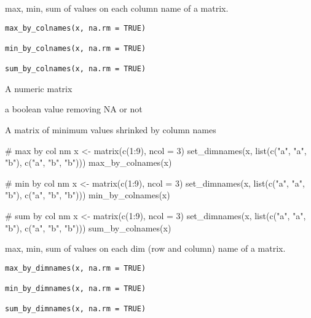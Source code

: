 \documentclass[letterpaper]{book}
\begin{document}
%
\begin{Description}
max, min, sum of values on each column name of a matrix.
\end{Description}
%
\begin{Usage}
\begin{verbatim}
max_by_colnames(x, na.rm = TRUE)

min_by_colnames(x, na.rm = TRUE)

sum_by_colnames(x, na.rm = TRUE)
\end{verbatim}
\end{Usage}
%
\begin{Arguments}
\begin{ldescription}
\item[\code{x}] A numeric matrix

\item[\code{na.rm}] a boolean value removing NA or not
\end{ldescription}
\end{Arguments}
%
\begin{Value}
A matrix of minimum values shrinked by column names
\end{Value}
%
\begin{Examples}
\begin{ExampleCode}
# max by col nm
x <- matrix(c(1:9), ncol = 3)
set_dimnames(x, list(c("a", "a", "b"), c("a", "b", "b")))
max_by_colnames(x)

# min by col nm
x <- matrix(c(1:9), ncol = 3)
set_dimnames(x, list(c("a", "a", "b"), c("a", "b", "b")))
min_by_colnames(x)

# sum by col nm
x <- matrix(c(1:9), ncol = 3)
set_dimnames(x, list(c("a", "a", "b"), c("a", "b", "b")))
sum_by_colnames(x)

\end{ExampleCode}
\end{Examples}
%
\begin{Description}
max, min, sum of values on each dim (row and column) name of a matrix.
\end{Description}
%
\begin{Usage}
\begin{verbatim}
max_by_dimnames(x, na.rm = TRUE)

min_by_dimnames(x, na.rm = TRUE)

sum_by_dimnames(x, na.rm = TRUE)
\end{verbatim}
\end{Usage}
\end{document}
